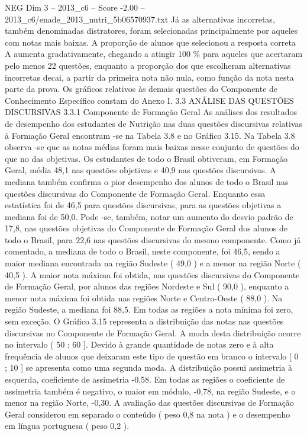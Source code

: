 \begin{textsample}{NEG Dim 3 – 2013\_c6 – Score -2.00 – 2013\_c6/enade\_2013\_nutri\_5b06570937.txt}
Já as alternativas incorretas, também denominadas distratores, foram selecionadas principalmente por aqueles com notas mais baixas.
A proporção de alunos que selecionou a resposta correta A aumenta gradativamente, chegando a atingir 100 \% para aqueles que acertaram pelo menos 22 questões, enquanto a proporção dos que escolheram alternativas incorretas decai, a partir da primeira nota não nula, como função da nota nesta parte da prova.
Os gráficos relativos às demais questões do Componente de Conhecimento Específico constam do Anexo I. 3.3 ANÁLISE DAS QUESTÕES DISCURSIVAS 3.3.1 Componente de Formação Geral As análises dos resultados de desempenho dos estudantes de Nutrição nas duas questões discursivas relativas à Formação Geral encontram -se na Tabela 3.8 e no Gráfico 3.15.
Na Tabela 3.8 observa -se que as notas médias foram mais baixas nesse conjunto de questões do que no das objetivas.
Os estudantes de todo o Brasil obtiveram, em Formação Geral, média 48,1 nas questões objetivas e 40,9 nas questões discursivas.
A mediana também confirma o pior desempenho dos alunos de todo o Brasil nas questões discursivas do Componente de Formação Geral.
Enquanto essa estatística foi de 46,5 para questões discursivas, para as questões objetivas a mediana foi de 50,0.
Pode -se, também, notar um aumento do desvio padrão de 17,8, nas questões objetivas do Componente de Formação Geral dos alunos de todo o Brasil, para 22,6 nas questões discursivas do mesmo componente.
Como já comentado, a mediana de todo o Brasil, neste componente, foi 46,5, sendo a maior mediana encontrada na região Sudeste ( 49,0 ) e a menor na região Norte ( 40,5 ).
A maior nota máxima foi obtida, nas questões discursivas do Componente de Formação Geral, por alunos das regiões Nordeste e Sul ( 90,0 ), enquanto a menor nota máxima foi obtida nas regiões Norte e Centro-Oeste ( 88,0 ).
Na região Sudeste, a mediana foi 88,5.
Em todas as regiões a nota mínima foi zero, sem exceção.
O Gráfico 3.15 representa a distribuição das notas nas questões discursivas no Componente de Formação Geral.
A moda desta distribuição ocorre no intervalo ( 50 ; 60 ].
Devido à grande quantidade de notas zero e à alta frequência de alunos que deixaram este tipo de questão em branco o intervalo [ 0 ; 10 ] se apresenta como uma segunda moda.
A distribuição possui assimetria à esquerda, coeficiente de assimetria -0,58.
Em todas as regiões o coeficiente de assimetria também é negativo, o maior em módulo, -0,78, na região Sudeste, e o menor na região Norte, -0,30.
A avaliação das questões discursivas de Formação Geral considerou em separado o conteúdo ( peso 0,8 na nota ) e o desempenho em língua portuguesa ( peso 0,2 ).

\end{textsample}
